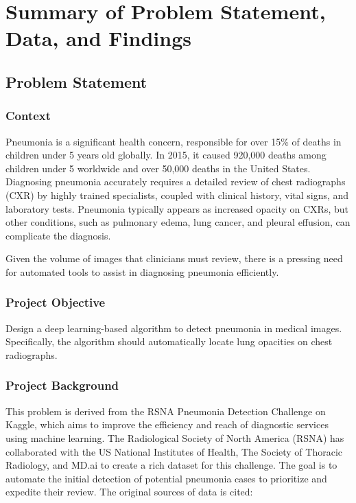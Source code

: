 \chapter{Summary of Problem Statement, Data, and Findings}
\label{cha:chapter 1}


\section{Problem Statement}
\label{sec:chap1 section 1}

\subsection{Context}
\label{subsec:chap1 section 1.1}
Pneumonia is a significant health concern, responsible for over 15\% of deaths in children under 5 years old globally. In 2015, it caused 920,000 deaths among children under 5 worldwide and over 50,000 deaths in the United States. Diagnosing pneumonia accurately requires a detailed review of chest radiographs (CXR) by highly trained specialists, coupled with clinical history, vital signs, and laboratory tests. Pneumonia typically appears as increased opacity on CXRs, but other conditions, such as pulmonary edema, lung cancer, and pleural effusion, can complicate the diagnosis.

Given the volume of images that clinicians must review, there is a pressing need for automated tools to assist in diagnosing pneumonia efficiently.

\subsection{Project Objective}
\label{subsec:chap1 section 1.2}

Design a deep learning-based algorithm to detect pneumonia in medical images. Specifically, the algorithm should automatically locate lung opacities on chest radiographs.

\subsection{Project Background}
\label{subsec:chap1 section 1.3}
This problem is derived from the RSNA Pneumonia Detection Challenge on Kaggle, which aims to improve the efficiency and reach of diagnostic services using machine learning. The Radiological Society of North America (RSNA) has collaborated with the US National Institutes of Health, The Society of Thoracic Radiology, and MD.ai to create a rich dataset for this challenge. The goal is to automate the initial detection of potential pneumonia cases to prioritize and expedite their review. The original sources of data is cited: ~\cite{rui2015emergency, cdc2015deaths, franquet2018pneumonia, kelly2012chest, wang2017chestxray8}


